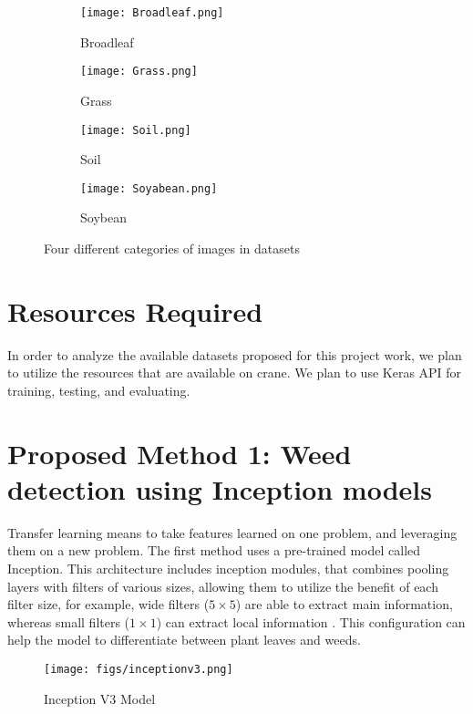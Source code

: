 \documentclass{report}
\begin{document}
\begin{figure}[H]
\centering
    \begin{subfigure}[b]{0.3\textwidth}
         \texttt{[image: Broadleaf.png]}
         \caption{Broadleaf}
         \label{fig:1}
     \end{subfigure}
    
     \begin{subfigure}[b]{0.3\textwidth}
\texttt{[image: Grass.png]}
         \caption{Grass}
         \label{fig:2}
     \end{subfigure}
     \begin{subfigure}[b]{0.3\textwidth}
         \texttt{[image: Soil.png]}
         \caption{Soil}
         \label{fig:3}
     \end{subfigure}
     \begin{subfigure}[b]{0.3\textwidth}
         \texttt{[image: Soyabean.png]}
         \caption{Soybean}
         \label{fig:4}
     \end{subfigure}
     \caption{Four different categories of images in datasets}
    \label{fig:lebeled_img}
\end{figure}
\section{Resources Required}
In order to analyze the available datasets proposed for this project work, we plan to utilize the resources that are available on crane. We plan to use Keras API for training, testing, and evaluating. 

\section{Proposed Method 1: Weed detection using Inception models}

Transfer learning means to take features learned on one problem, and leveraging them on a new problem. The first method uses a pre-trained model called Inception. This architecture includes inception modules, that combines pooling layers with filters of various sizes, allowing them to utilize the benefit of each filter size, for example, wide filters ($5 \times 5$) are able to extract main information, whereas small filters ($1 \times 1$) can extract local information \cite{szegedy2016rethinking}. This configuration can help the model to differentiate between plant leaves and weeds.


\begin{figure}[h]
    \centering
    \texttt{[image: figs/inceptionv3.png]}
    \caption{Inception V3 Model \cite{szegedy2016rethinking}}
    \label{fig:compute}
\end{figure}
\end{document}
